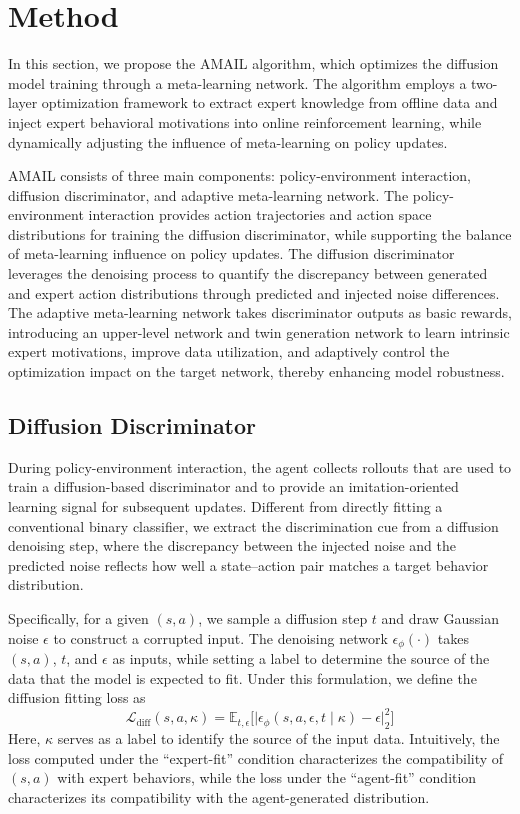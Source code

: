 \documentclass[lettersize,journal]{IEEEtran}
\begin{document}
\section{Method}
In this section, we propose the AMAIL algorithm, which optimizes the diffusion model training through a meta-learning network. The algorithm employs a two-layer optimization framework to extract expert knowledge from offline data and inject expert behavioral motivations into online reinforcement learning, while dynamically adjusting the influence of meta-learning on policy updates.

AMAIL consists of three main components: policy-environment interaction, diffusion discriminator, and adaptive meta-learning network. The policy-environment interaction provides action trajectories and action space distributions for training the diffusion discriminator, while supporting the balance of meta-learning influence on policy updates. The diffusion discriminator leverages the denoising process to quantify the discrepancy between generated and expert action distributions through predicted and injected noise differences. The adaptive meta-learning network takes discriminator outputs as basic rewards, introducing an upper-level network and twin generation network to learn intrinsic expert motivations, improve data utilization, and adaptively control the optimization impact on the target network, thereby enhancing model robustness.
\subsection{Diffusion Discriminator}
During policy-environment interaction, the agent collects rollouts that are used to train a diffusion-based discriminator and to provide an imitation-oriented learning signal for subsequent updates. Different from directly fitting a conventional binary classifier, we extract the discrimination cue from a diffusion denoising step, where the discrepancy between the injected noise and the predicted noise reflects how well a state–action pair matches a target behavior distribution.

Specifically, for a given $(s,a)$, we sample a diffusion step $t$ and draw Gaussian noise $\epsilon$ to construct a corrupted input. The denoising network $\epsilon_\phi(\cdot)$ takes $(s,a)$, $t$, and $\epsilon$ as inputs, while setting a label to determine the source of the data that the model is expected to fit. Under this formulation, we define the diffusion fitting loss as
\begin{equation}
  \label{eq:diff_loss}
  \mathcal{L}_{\text{diff}}(s,a,\kappa)= \mathbb{E}_{t,\epsilon}\Big[\big|\epsilon_\phi(s,a,\epsilon,t\mid \kappa)-\epsilon\big|_2^2\Big]
\end{equation}
Here, $\kappa$ serves as a label to identify the source of the input data. Intuitively, the loss computed under the “expert-fit” condition characterizes the compatibility of $(s,a)$ with expert behaviors, while the loss under the “agent-fit” condition characterizes its compatibility with the agent-generated distribution.
\end{document}
